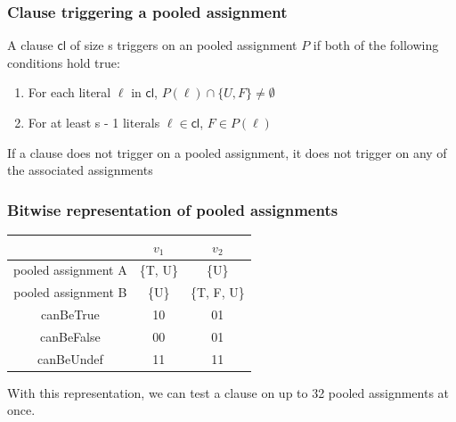 \documentclass{beamer}
\begin{document}
\begin{frame}
\frametitle{Clause triggering a pooled assignment}
\begin{definition}
	A clause $\mathsf{cl}$ of size s triggers on an pooled assignment $P$ if both of the following conditions hold true:
	\begin{enumerate}
		\item For each literal $\ell$ in $\mathsf{cl}$, $P(\ell) \cap \{U,F\} \neq \emptyset$
		\item For at least s - 1 literals $\ell \in \mathsf{cl}$, $F \in P(\ell)$
	\end{enumerate}
\end{definition}
If a clause does not trigger on a pooled assignment, it does not trigger on any of the associated assignments
\end{frame}

\begin{frame}
\frametitle{Bitwise representation of pooled assignments}
\begin{center}
\begin{tabular}{ | c | c | c |}
\hline
 & $v_1$ & $v_2$ \\ 
\hline
pooled assignment A & \{T, U\} & \{U\} \\  
pooled assignment B & \{U\} & \{T, F, U\} \\    
\hline
canBeTrue & 10 & 01 \\
canBeFalse & 00 & 01 \\
canBeUndef & 11 & 11 \\
\hline
\end{tabular}
\end{center}

With this representation, we can test a clause on up to 32 pooled assignments at once.
\end{frame}
\end{document}
